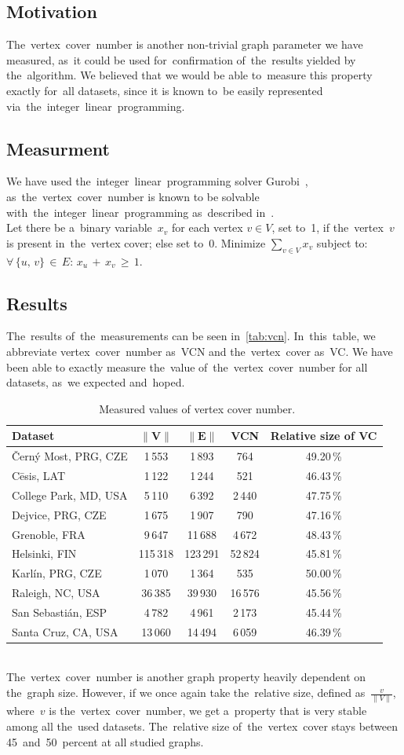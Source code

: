 \subsection{Motivation}
The~vertex~cover~number is another non-trivial graph parameter we have measured, as~it could be used for~confirmation of~the~results yielded by the~algorithm. We believed that we would be able to~measure this property exactly for~all datasets, since it is known to~be easily represented via~the~integer~linear~programming.
\subsection{Measurment}
We have used the~integer~linear~programming solver Gurobi~\cite{gurobi}, as~the~vertex~cover~number is known to be solvable with~the~integer~linear~programming as~described in~\cite{Vazirani}.\\
Let there be a~binary variable~$x_v$ for each vertex $v \in V$, set to~1, if the~vertex~$v$ is present in~the~vertex cover; else set to~0. Minimize $\sum_{v \in V} x_v$ subject to: ${\forall\,\{u,\,v\}\,\in\,E:\,x_u\,+\,x_v\,\geq\,1}$.
\subsection{Results}
The~results of~the~measurements can be seen in~\autoref{tab:vcn}. In~this~table, we abbreviate vertex~cover~number as~VCN and the~vertex~cover as~VC. We have been able to exactly measure the~value of~the~vertex~cover~number for all datasets, as~we expected and~hoped.
\begin{table}[h!]
\centering
\caption[Measured values of vertex cover number]{~Measured values of vertex cover number.}\label{tab:vcn}
\begin{tabular}{l|c|c|c|c}
	\textbf{Dataset}		& $\|\mathbf{V}\|$		& $\|\mathbf{E}\|$& \textbf{VCN}   & \textbf{Relative size of VC}\tabularnewline \hline \hline
 	Černý Most, PRG, CZE & 1\,553	& 1\,893 & 764 & 49.20\,\%\tabularnewline \hline
 	Cēsis, LAT	& 1\,122	& 1\,244	& 521 & 46.43\,\% \tabularnewline \hline
 	College Park, MD, USA & 5\,110 & 6\,392 & 2\,440 & 47.75\,\%	\tabularnewline \hline
 	Dejvice, PRG, CZE & 1\,675 & 1\,907 & 790 & 47.16\,\%	\tabularnewline \hline
 	Grenoble, FRA & 9\,647 & 11\,688 & 4\,672 & 48.43\,\% \tabularnewline \hline
    Helsinki, FIN & 115\,318 & 123\,291 & 52\,824 & 45.81\,\%	\tabularnewline \hline
 	Karlín, PRG, CZE & 1\,070 & 1\,364 & 535 & 50.00\,\%	\tabularnewline \hline
 	Raleigh, NC, USA & 36\,385 & 39\,930 & 16\,576 & 45.56\,\%	\tabularnewline \hline
 	San Sebastián, ESP & 4\,782 & 4\,961 & 2\,173 & 45.44\,\%	\tabularnewline \hline
 	Santa Cruz, CA, USA & 13\,060 & 14\,494 & 6\,059 & 46.39\,\%	\tabularnewline
\end{tabular}
\end{table}
\\
The~vertex~cover~number is another graph property heavily dependent on the~graph size. However, if we once again take the~relative size, defined as~$\frac{v}{\|V\|}$, where~$v$ is the~vertex~cover~number, we get a~property that is very stable among all the~used datasets. The~relative size of~the~vertex~cover stays between 45~and~50~percent at all studied graphs.
